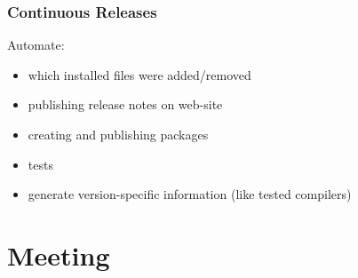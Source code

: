 \begin{frame}
	\frametitle{Continuous Releases}

	Automate:

	\begin{itemize}[<+-| alert@+>]
	\item which installed files were added/removed
	\item publishing release notes on web-site
	\item creating and publishing packages
	\item tests
	\item generate version-specific information (like tested compilers)
	\end{itemize}
\end{frame}

\section{Meeting}

